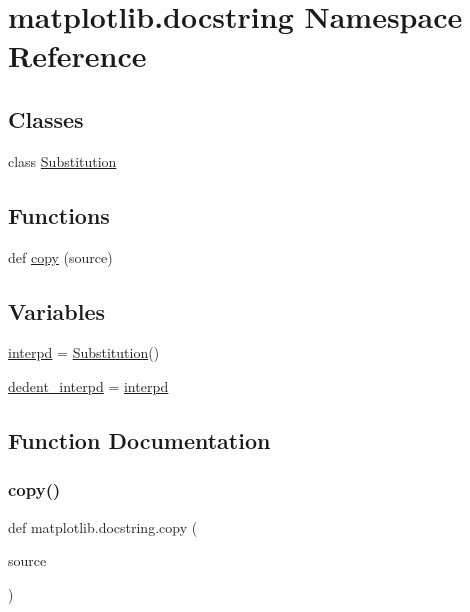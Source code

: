 \hypertarget{namespacematplotlib_1_1docstring}{}\section{matplotlib.\+docstring Namespace Reference}
\label{namespacematplotlib_1_1docstring}
\subsection*{Classes}
\begin{DoxyCompactItemize}
\item 
class \hyperlink{classmatplotlib_1_1docstring_1_1Substitution}{Substitution}
\end{DoxyCompactItemize}
\subsection*{Functions}
\begin{DoxyCompactItemize}
\item 
def \hyperlink{namespacematplotlib_1_1docstring_a60f3d9e1d81065eaf8ce3fd4a6468417}{copy} (source)
\end{DoxyCompactItemize}
\subsection*{Variables}
\begin{DoxyCompactItemize}
\item 
\hyperlink{namespacematplotlib_1_1docstring_adb2bde075939e0557d716d59fb6db7fb}{interpd} = \hyperlink{classmatplotlib_1_1docstring_1_1Substitution}{Substitution}()
\item 
\hyperlink{namespacematplotlib_1_1docstring_accdc7041014e961f4c48fe7540998d38}{dedent\+\_\+interpd} = \hyperlink{namespacematplotlib_1_1docstring_adb2bde075939e0557d716d59fb6db7fb}{interpd}
\end{DoxyCompactItemize}


\subsection{Function Documentation}
\mbox{\label{namespacematplotlib_1_1docstring_a60f3d9e1d81065eaf8ce3fd4a6468417}} 
\subsubsection{\texorpdfstring{copy()}{copy()}}
{\footnotesize\ttfamily def matplotlib.\+docstring.\+copy (\begin{DoxyParamCaption}\item[{}]{source }\end{DoxyParamCaption})}

